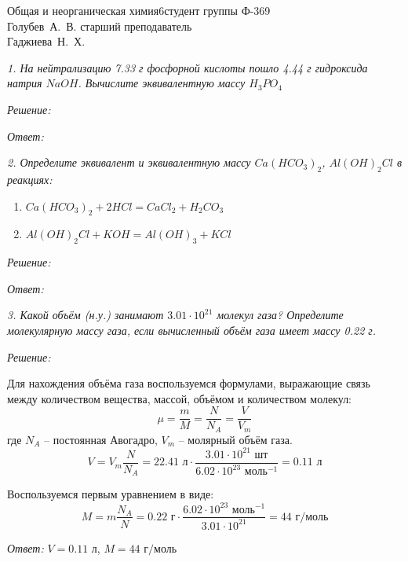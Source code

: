 





{Общая и неорганическая химия}{}{6}{студент группы Ф-369\\Голубев~А.~В.}
{}{старший преподаватель \\Гаджиева~Н.~Х.}{}{}

\pagebreak

\emph{1. На нейтрализацию 7.33 г фосфорной кислоты пошло 4.44 г 
гидроксида натрия \( NaOH \). Вычислите эквивалентную массу 
\( H_3 PO_4 \)}

\emph{Решение:}

\emph{Ответ: }

\pagebreak

\emph{2. Определите эквивалент и эквивалентную массу \( Ca(HCO_3)_2 \), 
\( Al(OH)_2Cl \) в реакциях:}
\begin{enumerate}
    \item \( Ca(HCO_3)_2 + 2HCl = CaCl_2 + H_2CO_3 \)
    \item \( Al(OH)_2Cl + KOH = Al(OH)_3 + KCl \)
\end{enumerate}

\emph{Решение:}

\emph{Ответ: }

\pagebreak

\emph{3. Какой объём (н.у.) занимают \( 3.01\cdot10^{21} \) молекул 
газа? Определите молекулярную массу газа, если вычисленный объём газа 
имеет массу 0.22 г.}

\emph{Решение:}

Для нахождения объёма газа воспользуемся формулами, выражающие связь 
между количеством вещества, массой, объёмом и количеством молекул:
\[
	\mu = \frac{m}{M} = \frac{N}{N_A} = \frac{V}{V_m}
\]
где \( N_A \) -- постоянная Авогадро, \( V_m \) -- молярный объём газа.
\[
	V = V_m \frac{N}{N_A} = 22.41 \text{ л} \cdot 
	\frac{3.01\cdot10^{21} \text{ шт}}{6.02\cdot10^{23} \text{ моль}^{-1}} =
	0.11 \text{ л}
\]

Воспользуемся первым уравнением в виде:
\[
	M = m\frac{N_A}{N} = 0.22 \text{ г} \cdot  
	\frac{6.02\cdot10^{23} \text{ моль}^{-1}}{3.01\cdot10^{21}} =
	44 \text{ г/моль}
\]

\emph{Ответ: } \( V = 0.11 \text{ л} \), 
\( M = 44 \text{ г/моль} \)

